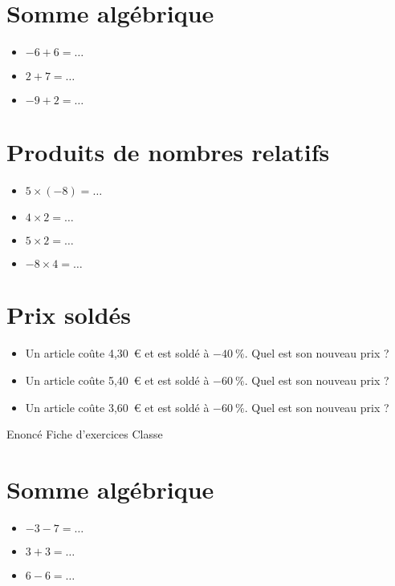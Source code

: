 \documentclass[a4paper,11pt,fleqn]{article}
\begin{document}
\section{Somme algébrique}
\begin{itemize}

  \item $-6 +6=\ldots$
  \item $2 +7=\ldots$
  \item $-9 +2=\ldots$
\end{itemize}


\section{Produits de nombres relatifs}
\begin{itemize}

  \item $5\times(-8)=\ldots$
  \item $4\times2=\ldots$
  \item $5\times2=\ldots$
  \item $-8\times4=\ldots$
\end{itemize}


\section{Prix soldés}
\begin{itemize}

  \item Un article coûte 4,30~€ et est soldé à $-40~\%$. Quel est son nouveau prix ?
  \item Un article coûte 5,40~€ et est soldé à $-60~\%$. Quel est son nouveau prix ?
  \item Un article coûte 3,60~€ et est soldé à $-60~\%$. Quel est son nouveau prix ?
\end{itemize}
\newpage
\setcounter{exo}{0}
\setcounter{section}{0}
{Enoncé} \hfill {\huge Fiche d'exercices } \hfill {Classe}

\section{Somme algébrique}
\begin{itemize}

  \item $-3 -7=\ldots$
  \item $3 +3=\ldots$
  \item $6 -6=\ldots$
\end{itemize}
\end{document}
